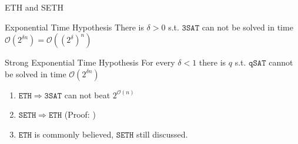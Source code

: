 \begin{frame}[c]{ETH and SETH}
    \begin{exampleblock}{Exponential Time Hypothesis}
        There is $\delta > 0$ s.t. $\mathtt{3SAT}$ can not be solved in time $\mathcal{O}(2^{\delta n}) = \mathcal{O}((2^{\delta})^n)$ 
    \end{exampleblock}
    
    \pause\begin{exampleblock}{Strong Exponential Time Hypothesis}
        For every $\delta < 1$ there is $q$ s.t. $\mathtt{qSAT}$ cannot be solved in time $\mathcal{O}(2^{\delta n})$
    \end{exampleblock}
    
    
\begin{enumerate}
    \pause\item $\mathtt{ETH} \Rightarrow \mathtt{3SAT}$ can not beat $2^{\mathcal{O}(n)}$ 
    \pause\item $\mathtt{SETH} \Rightarrow \mathtt{ETH}$ (Proof: \cite[Theorem 14.5]{Cygan2015})
    \pause\item  $\mathtt{ETH}$ is commonly believed, $\mathtt{SETH}$ still discussed.
\end{enumerate}
\end{frame}

